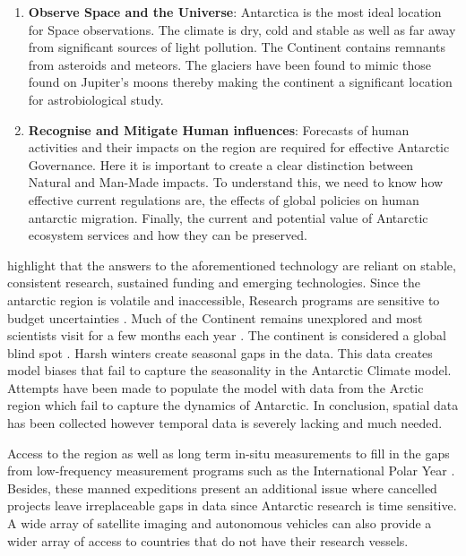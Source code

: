 \begin{enumerate}
       \item \textbf{Observe Space and the Universe}: 
        \newline 
        \newline
       Antarctica is the most ideal location for Space observations. The climate is dry, cold and stable as well as far away from significant sources of light pollution. The Continent contains remnants from asteroids and meteors. The glaciers have been found to mimic those found on Jupiter's moons thereby making the continent a significant location for astrobiological study.

    \item \textbf{Recognise and Mitigate Human influences}:
    \newline 
    \newline
    Forecasts of human activities and their impacts on the region are required for effective Antarctic Governance. Here it is important to create a clear distinction between Natural and Man-Made impacts. To understand this, we need to know how effective current regulations are, the effects of global policies on human antarctic migration. Finally, the current and potential value of Antarctic ecosystem services and how they can be preserved.
\end{enumerate}

\textcite{kennicutt2014polar} highlight that the answers to the aforementioned technology are reliant on stable, consistent research, sustained funding and emerging technologies. Since the antarctic region is volatile and inaccessible, Research programs are sensitive to budget uncertainties \cite{kennicutt2014polar}. Much of the Continent remains unexplored and most scientists visit for a few months each year \cite{kennicutt2014polar}. The continent is considered a global blind spot \cite{Scale2019Cruise}. Harsh winters create seasonal gaps in the data. This data creates model biases that fail to capture the seasonality in the Antarctic Climate model. Attempts have been made to populate the model with data from the Arctic region \cite{vichi2019effects} which fail to capture the dynamics of Antarctic. In conclusion, spatial data has been collected however temporal data is severely lacking and much needed.\par 
Access to the region as well as long term in-situ measurements to fill in the gaps from low-frequency measurement programs such as the International Polar Year \cite{kennicutt2014polar}. Besides, these manned expeditions present an additional issue where cancelled projects leave irreplaceable gaps in data since Antarctic research is time sensitive\cite{kennicutt2014polar}. A wide array of satellite imaging and autonomous vehicles can also provide a wider array of access to countries that do not have their research vessels. \par 


